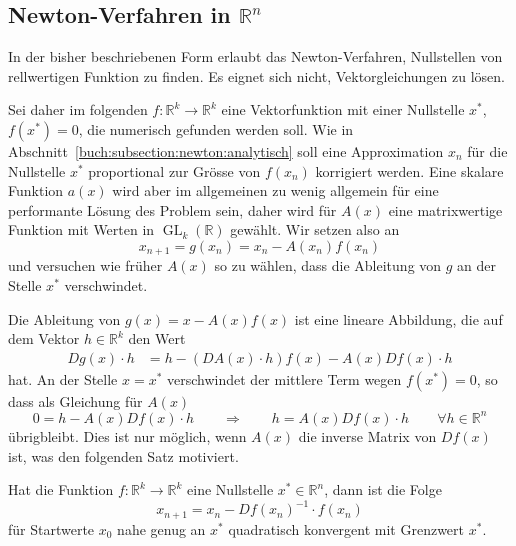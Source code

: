 %
%
\subsection{Newton-Verfahren in $\mathbb R^n$
\label{buch:section:newtoninRn}}
%
In der bisher beschriebenen Form erlaubt das Newton-Verfahren, 
Nullstellen von rellwertigen Funktion zu finden.
Es eignet sich nicht, Vektorgleichungen zu lösen.
%

Sei daher im folgenden $f\colon \mathbb R^k \to \mathbb R^k$ eine
Vektorfunktion mit einer Nullstelle $x^*$, $f(x^*)=0$, die numerisch gefunden 
werden soll.
Wie in Abschnitt~\ref{buch:subsection:newton:analytisch} soll eine
Approximation $x_n$ für die Nullstelle $x^*$ proportional zur Grösse
von $f(x_n)$ korrigiert werden.
Eine skalare Funktion $a(x)$ wird aber im allgemeinen zu wenig
allgemein für eine performante Lösung des Problem sein, daher
wird für $A(x)$ eine matrixwertige Funktion mit Werten in
$\operatorname{GL}_k(\mathbb R)$ gewählt.
%
%
Wir setzen also an
\[
x_{n+1} = g(x_n) = x_n - A(x_n) f(x_n)
\]
und versuchen wie früher $A(x)$ so zu wählen, dass die Ableitung von $g$
an der Stelle $x^*$ verschwindet.

Die Ableitung von $g(x)=x-A(x)f(x)$ ist
eine lineare Abbildung, die auf dem Vektor $h\in\mathbb R^k$ den Wert
\begin{align*}
Dg(x) \cdot h
&=
h - (DA(x)\cdot h) f(x) - A(x) Df(x)\cdot h
\end{align*}
hat.
An der Stelle $x=x^*$ verschwindet der mittlere Term wegen $f(x^*)=0$, so
dass als Gleichung für $A(x)$
\[
0=h-A(x) Df(x) \cdot h
\qquad\Rightarrow\qquad
h = A(x) Df(x) \cdot h\qquad \forall h\in\mathbb R^n
\]
übrigbleibt.
Dies ist nur möglich, wenn $A(x)$ die inverse Matrix von $Df(x)$ ist,
was den folgenden Satz motiviert.

\begin{satz}
\label{buch:satz:newtonVektorgleichungen}
Hat die Funktion $f\colon\mathbb R^k\to\mathbb R^k$ eine Nullstelle
$x^*\in\mathbb R^n$, dann ist die Folge 
\[
x_{n+1} = x_n - Df(x_n)^{-1}\cdot f(x_n)
\]
für Startwerte $x_0$ nahe genug an $x^*$ quadratisch konvergent mit
Grenzwert $x^*$.
\end{satz}

